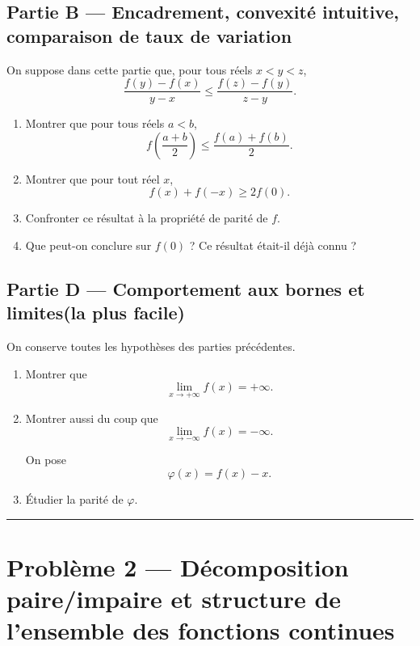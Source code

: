 \documentclass[11pt,a4paper]{article}
\begin{document}
\subsection*{Partie B --- Encadrement, convexité intuitive, comparaison de taux de variation}

On suppose dans cette partie que, pour tous réels \(x<y<z\),
\[
\frac{f(y)-f(x)}{y-x}\le \frac{f(z)-f(y)}{z-y}.
\]

\begin{enumerate}[label=\arabic*.]
    \item Montrer que pour tous réels \(a<b\),
    \[
    f\!\left(\frac{a+b}{2}\right)\le \frac{f(a)+f(b)}{2}.
    \]
    \item Montrer que pour tout réel \(x\),
    \[
    f(x)+f(-x)\ge 2f(0).
    \]
    \item Confronter ce résultat à la propriété de parité de \(f\).
    \item Que peut-on conclure sur \(f(0)\) ? Ce résultat était-il déjà connu ?
    
\end{enumerate}

\subsection*{Partie D --- Comportement aux bornes et limites(la plus facile)}

On conserve toutes les hypothèses des parties précédentes.

\begin{enumerate}[label=\arabic*.]
    

    \item Montrer que
    \[
    \lim_{x\to +\infty} f(x)=+\infty.
    \]

    

    \item Montrer aussi du coup que
    \[
    \lim_{x\to -\infty} f(x)=-\infty.
    \]

     On pose
    \[
    \varphi(x)=f(x)-x.
    \]
    

   

    \item Étudier la parité de \(\varphi\).

   
\end{enumerate}

\vspace{1em}
\hrule
\vspace{1em}

\section*{Problème 2 --- Décomposition paire/impaire et structure de l’ensemble des fonctions continues}
\end{document}
